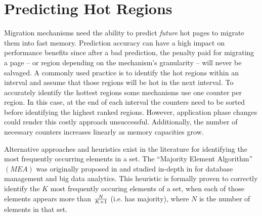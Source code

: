 
\section{Predicting Hot Regions}
\label{sec:MEA}


Migration mechanisms need the ability to predict \textit{future} hot pages to migrate them into fast memory. Prediction accuracy can have a high impact on performance benefits since after a bad prediction, the penalty paid for migrating a page -- or region depending on the mechanism's granularity -- will never be salvaged. A commonly used practice is to identify the hot regions within an interval and assume that those regions will be hot in the next interval. To accurately identify the hottest regions some mechanisms use one counter per region. In this case, at the end of each interval the counters need to be sorted before identifying the highest ranked regions. However, application phase changes could render this costly approach unsuccessful. Additionally, the number of necessary counters increases linearly as memory capacities grow.

Alternative approaches and heuristics exist in the literature for identifying the most frequently occurring elements in a set. The ``Majority Element Algorithm'' $(MEA)$ was originally proposed in \cite{karp-mea} and studied in-depth in \cite{charikar-mea} for database management and big data analytics. This heuristic is formally proven to correctly identify the $K$ most frequently occuring elements of a set, when each of those elements appears more than $N \over K+1$ (i.e. has majority), where $N$ is the number of elements in that set. 


